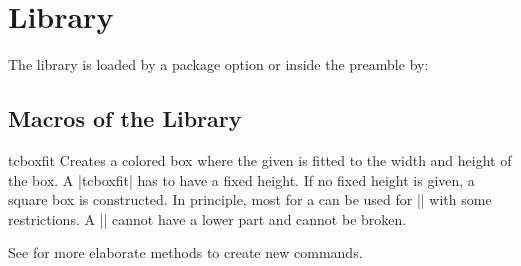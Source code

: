 \clearpage
\section{Library }\label{sec:fitting}%
%
The library is loaded by a package option or inside the preamble by:
\begin{dispListing}
\end{dispListing}

\subsection{Macros of the Library}

\begin{docCommand}{tcboxfit}{}
  Creates a colored box where the given  is fitted to
  the width and height of the box. A |tcboxfit| has to have a fixed height.
  If no fixed height is given, a square box is constructed.
  In principle, most  for a 
  can be used for |\tcboxfit| with some restrictions. A |\tcboxfit| cannot have
  a lower part and cannot be broken.

\enlargethispage*{1cm}
\begin{dispExample}
\begin{tcbraster}[raster columns=3,raster valign=bottom]
  \tcboxfit[height=8cm]{\lipsum[1]}
  \tcboxfit[height=4cm]{\lipsum[1]}
  \tcboxfit[height=2cm]{\lipsum[1]}
\end{tcbraster}
\begin{tcbraster}[colback=green!10!white,boxsep=1mm]
  \tcboxfit[height=4cm]{\lipsum[2]}
  \tcboxfit[height=4cm,title=With a title]{\lipsum[2]}
\end{tcbraster}
\end{dispExample}
\end{docCommand}

\clearpage
\begin{marker}
See  for more
elaborate methods to create new commands.
\end{marker}

\enlargethispage*{2cm}

